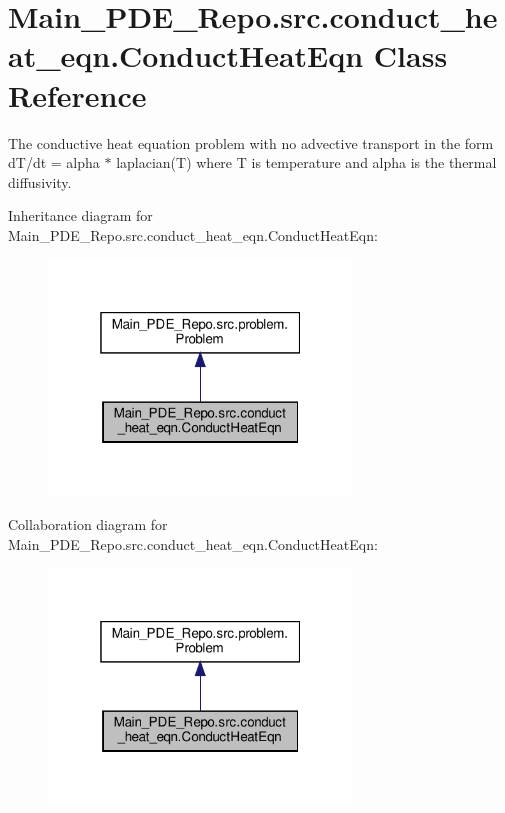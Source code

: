 \hypertarget{classMain__PDE__Repo_1_1src_1_1conduct__heat__eqn_1_1ConductHeatEqn}{}\section{Main\+\_\+\+P\+D\+E\+\_\+\+Repo.\+src.\+conduct\+\_\+heat\+\_\+eqn.\+Conduct\+Heat\+Eqn Class Reference}
\label{classMain__PDE__Repo_1_1src_1_1conduct__heat__eqn_1_1ConductHeatEqn}


The conductive heat equation problem with no advective transport in the form d\+T/dt = alpha $\ast$ laplacian(\+T) where T is temperature and alpha is the thermal diffusivity.  




Inheritance diagram for Main\+\_\+\+P\+D\+E\+\_\+\+Repo.\+src.\+conduct\+\_\+heat\+\_\+eqn.\+Conduct\+Heat\+Eqn\+:
\nopagebreak
\begin{figure}[H]
\begin{center}
\leavevmode
\includegraphics[width=229pt]{classMain__PDE__Repo_1_1src_1_1conduct__heat__eqn_1_1ConductHeatEqn__inherit__graph}
\end{center}
\end{figure}


Collaboration diagram for Main\+\_\+\+P\+D\+E\+\_\+\+Repo.\+src.\+conduct\+\_\+heat\+\_\+eqn.\+Conduct\+Heat\+Eqn\+:
\nopagebreak
\begin{figure}[H]
\begin{center}
\leavevmode
\includegraphics[width=229pt]{classMain__PDE__Repo_1_1src_1_1conduct__heat__eqn_1_1ConductHeatEqn__coll__graph}
\end{center}
\end{figure}
